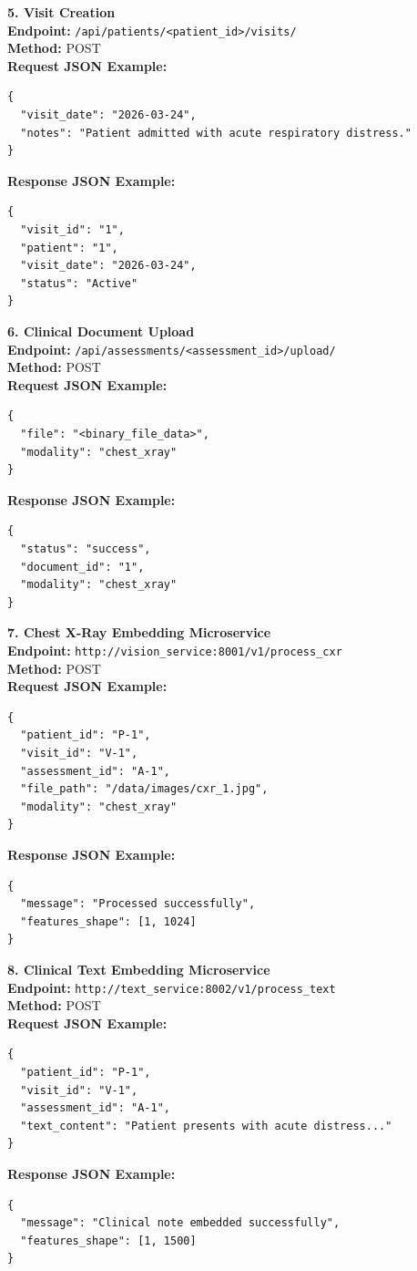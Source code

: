 \documentclass{fisatprojectfinal}
\begin{document}
\textbf{5. Visit Creation} \\
\textbf{Endpoint:} \texttt{/api/patients/<patient\_id>/visits/} \\
\textbf{Method:} POST \\
\textbf{Request JSON Example:}
\begin{verbatim}
{
  "visit_date": "2026-03-24",
  "notes": "Patient admitted with acute respiratory distress."
}
\end{verbatim}
\textbf{Response JSON Example:}
\begin{verbatim}
{
  "visit_id": "1",
  "patient": "1",
  "visit_date": "2026-03-24",
  "status": "Active"
}
\end{verbatim}

\textbf{6. Clinical Document Upload} \\
\textbf{Endpoint:} \texttt{/api/assessments/<assessment\_id>/upload/} \\
\textbf{Method:} POST \\
\textbf{Request JSON Example:}
\begin{verbatim}
{
  "file": "<binary_file_data>",
  "modality": "chest_xray"
}
\end{verbatim}
\textbf{Response JSON Example:}
\begin{verbatim}
{
  "status": "success",
  "document_id": "1",
  "modality": "chest_xray"
}
\end{verbatim}

\textbf{7. Chest X-Ray Embedding Microservice} \\
\textbf{Endpoint:} \texttt{http://vision\_service:8001/v1/process\_cxr} \\
\textbf{Method:} POST \\
\textbf{Request JSON Example:}
\begin{verbatim}
{
  "patient_id": "P-1",
  "visit_id": "V-1",
  "assessment_id": "A-1",
  "file_path": "/data/images/cxr_1.jpg",
  "modality": "chest_xray"
}
\end{verbatim}
\textbf{Response JSON Example:}
\begin{verbatim}
{
  "message": "Processed successfully",
  "features_shape": [1, 1024]
}
\end{verbatim}

\textbf{8. Clinical Text Embedding Microservice} \\
\textbf{Endpoint:} \texttt{http://text\_service:8002/v1/process\_text} \\
\textbf{Method:} POST \\
\textbf{Request JSON Example:}
\begin{verbatim}
{
  "patient_id": "P-1",
  "visit_id": "V-1",
  "assessment_id": "A-1",
  "text_content": "Patient presents with acute distress..."
}
\end{verbatim}
\textbf{Response JSON Example:}
\begin{verbatim}
{
  "message": "Clinical note embedded successfully",
  "features_shape": [1, 1500]
}
\end{verbatim}
\end{document}
